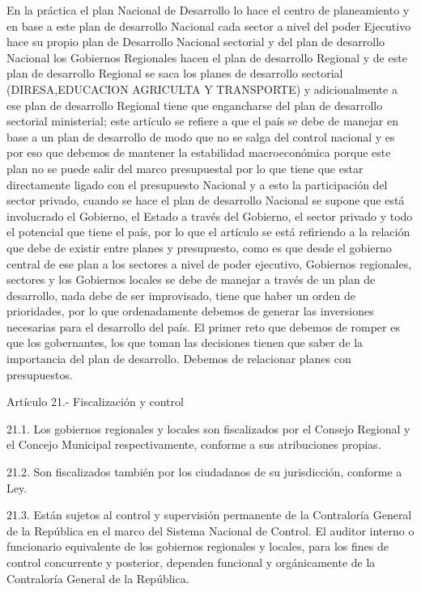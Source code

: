 \documentclass[
  jou,
  floatsintext,
  longtable,
  a4paper,
  nolmodern,
  notxfonts,
  notimes,
  12pt,
  colorlinks=true,linkcolor=blue,citecolor=blue,urlcolor=blue]{apa7}
\begin{document}
En la práctica el plan Nacional de Desarrollo lo hace el centro de
planeamiento y en base a este plan de desarrollo Nacional cada sector a
nivel del poder Ejecutivo hace su propio plan de Desarrollo Nacional
sectorial y del plan de desarrollo Nacional los Gobiernos Regionales
hacen el plan de desarrollo Regional y de este plan de desarrollo
Regional se saca los planes de desarrollo sectorial (DIRESA,EDUCACION
AGRICULTA Y TRANSPORTE) y adicionalmente a ese plan de desarrollo
Regional tiene que engancharse del plan de desarrollo sectorial
ministerial; este artículo se refiere a que el país se debe de manejar
en base a un plan de desarrollo de modo que no se salga del control
nacional y es por eso que debemos de mantener la estabilidad
macroeconómica porque este plan no se puede salir del marco presupuestal
por lo que tiene que estar directamente ligado con el presupuesto
Nacional y a esto la participación del sector privado, cuando se hace el
plan de desarrollo Nacional se supone que está involucrado el Gobierno,
el Estado a través del Gobierno, el sector privado y todo el potencial
que tiene el país, por lo que el artículo se está refiriendo a la
relación que debe de existir entre planes y presupuesto, como es que
desde el gobierno central de ese plan a los sectores a nivel de poder
ejecutivo, Gobiernos regionales, sectores y los Gobiernos locales se
debe de manejar a través de un plan de desarrollo, nada debe de ser
improvisado, tiene que haber un orden de prioridades, por lo que
ordenadamente debemos de generar las inversiones necesarias para el
desarrollo del país. El primer reto que debemos de romper es que los
gobernantes, los que toman las decisiones tienen que saber de la
importancia del plan de desarrollo. Debemos de relacionar planes con
presupuestos.

Artículo 21.- Fiscalización y control

21.1. Los gobiernos regionales y locales son fiscalizados por el Consejo
Regional y el Concejo Municipal respectivamente, conforme a sus
atribuciones propias.

21.2. Son fiscalizados también por los ciudadanos de su jurisdicción,
conforme a Ley.

21.3. Están sujetos al control y supervisión permanente de la
Contraloría General de la República en el marco del Sistema Nacional de
Control. El auditor interno o funcionario equivalente de los gobiernos
regionales y locales, para los fines de control concurrente y posterior,
dependen funcional y orgánicamente de la Contraloría General de la
República.
\end{document}
